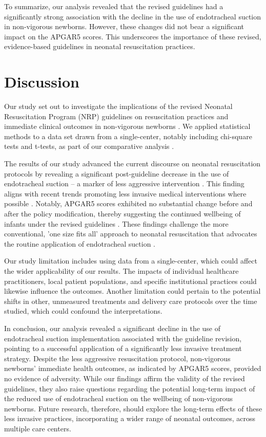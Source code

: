\documentclass[11pt]{article}
\begin{document}
To summarize, our analysis revealed that the revised guidelines had a significantly strong association with the decline in the use of endotracheal suction in non-vigorous newborns. However, these changes did not bear a significant impact on the APGAR5 scores. This underscores the importance of these revised, evidence-based guidelines in neonatal resuscitation practices.

\section*{Discussion}

Our study set out to investigate the implications of the revised Neonatal Resuscitation Program (NRP) guidelines on resuscitation practices and immediate clinical outcomes in non-vigorous newborns \cite{Simas2011ImpactOU}. We applied statistical methods to a data set drawn from a single-center, notably including chi-square tests and t-tests, as part of our comparative analysis \cite{Adams2003GuidelinesFT}. 

The results of our study advanced the current discourse on neonatal resuscitation protocols by revealing a significant post-guideline decrease in the use of endotracheal suction – a marker of less aggressive intervention \cite{Gerhard-Herman20162016AG}. This finding aligns with recent trends promoting less invasive medical interventions where possible \cite{Otto20202020AG, Anderson2020ESHREGF}. Notably, APGAR5 scores exhibited no substantial change before and after the policy modification, thereby suggesting the continued wellbeing of infants under the revised guidelines \cite{Raghu2015AnOA}. These findings challenge the more conventional, 'one size fits all' approach to neonatal resuscitation that advocates the routine application of endotracheal suction \cite{Carbine2000VideoRA}.

Our study limitation includes using data from a single-center, which could affect the wider applicability of our results. The impacts of individual healthcare practitioners, local patient populations, and specific institutional practices could likewise influence the outcomes. Another limitation could pertain to the potential shifts in other, unmeasured treatments and delivery care protocols over the time studied, which could confound the interpretations.

In conclusion, our analysis revealed a significant decline in the use of endotracheal suction implementation associated with the guideline revision, pointing to a successful application of a significantly less invasive treatment strategy. Despite the less aggressive resuscitation protocol, non-vigorous newborns' immediate health outcomes, as indicated by APGAR5 scores, provided no evidence of adversity. While our findings affirm the validity of the revised guidelines, they also raise questions regarding the potential long-term impact of the reduced use of endotracheal suction on the wellbeing of non-vigorous newborns. Future research, therefore, should explore the long-term effects of these less invasive practices, incorporating a wider range of neonatal outcomes, across multiple care centers.
\end{document}
